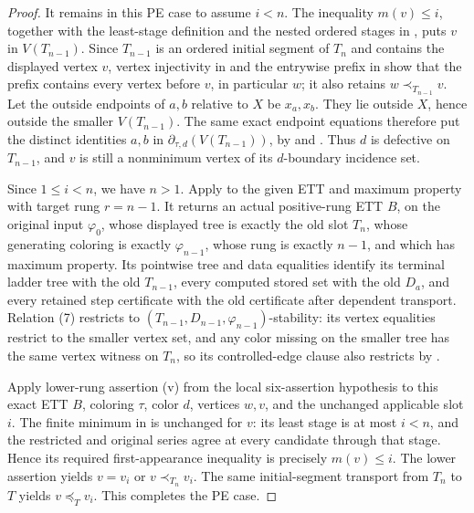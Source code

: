 \begin{proof}
It remains in this PE case to assume \(i<n\). The inequality
\(m(v)\leq i\), together with the least-stage definition
 and the nested ordered stages in
, puts \(v\) in \(V(T_{n-1})\). Since
\(T_{n-1}\) is an ordered initial segment of \(T_n\) and contains the
displayed vertex \(v\), vertex injectivity in  and
the entrywise prefix in  show that
the prefix contains every vertex before
\(v\), in particular \(w\); it also retains
\(w\prec_{T_{n-1}}v\). Let the outside endpoints of \(a,b\) relative to
\(X\) be \(x_a,x_b\). They lie outside \(X\), hence outside the smaller
\(V(T_{n-1})\). The same exact endpoint equations therefore put the
distinct identities \(a,b\) in
\(\partial_{\tau,d}(V(T_{n-1}))\), by
 and . Thus \(d\) is
defective on \(T_{n-1}\), and \(v\) is still a nonminimum vertex of its
\(d\)-boundary incidence set.

Since \(1\leq i<n\), we have \(n>1\).  Apply
 to the given ETT and maximum property
with target rung \(r=n-1\).  It returns an actual positive-rung ETT
\(B\), on the original input \(\varphi_0\), whose displayed tree is
exactly the old slot \(T_n\), whose generating coloring is exactly
\(\varphi_{n-1}\), whose rung is exactly \(n-1\), and which has maximum
property.  Its pointwise tree and data equalities identify its terminal
ladder tree with the old \(T_{n-1}\), every computed stored set with the
old \(D_a\), and every retained step certificate with the old certificate
after dependent transport.  Relation (7)
restricts to
\((T_{n-1},D_{n-1},\varphi_{n-1})\)-stability: its vertex equalities
restrict to the smaller vertex set, and any color missing on the smaller
tree has the same vertex witness on \(T_n\), so its controlled-edge clause
also restricts by .

Apply lower-rung assertion (v) from the local six-assertion hypothesis to
this exact ETT \(B\), coloring \(\tau\), color \(d\), vertices \(w,v\),
and the unchanged applicable slot \(i\). The finite minimum in
 is unchanged for \(v\): its least stage
is at most \(i<n\), and the restricted and original series agree at every
candidate through that stage. Hence its required first-appearance
inequality is precisely \(m(v)\leq i\). The lower assertion yields
\(v=v_i\) or \(v\prec_{T_n}v_i\). The same initial-segment transport from
\(T_n\) to \(T\) yields \(v\preceq_Tv_i\). This completes the PE case.


\end{proof}
